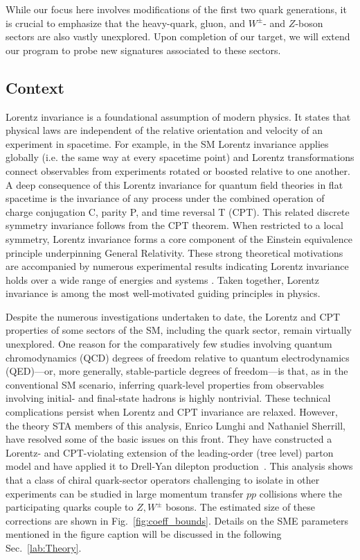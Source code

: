 While our focus here involves modifications of
the first two quark generations, it 
is crucial to emphasize that 
the heavy-quark, gluon, and 
$W^\pm$- and $Z$-boson sectors are also 
vastly unexplored. Upon completion 
of our target, we will extend our program to probe
new signatures associated to these sectors.

\subsection{Context}
\label{ssec:Context}
Lorentz invariance is a foundational assumption
of modern physics. It states that 
physical laws are independent of the relative orientation 
and velocity of an experiment in spacetime. 
For example, in the SM
Lorentz invariance applies 
globally (i.e. the same way at every spacetime point) 
and Lorentz transformations connect
observables from experiments rotated or boosted
relative to one another.
A deep consequence of this Lorentz invariance for
quantum field theories in flat spacetime
is the invariance of any process under
the combined operation of charge conjugation C,  
parity P, and time reversal T (CPT). This 
related discrete symmetry invariance 
follows from the CPT theorem.
%
When restricted to a local symmetry,
Lorentz invariance forms a core component 
of the Einstein equivalence principle 
underpinning General Relativity.
These strong theoretical motivations are accompanied by
numerous experimental results indicating 
Lorentz invariance holds over a wide
range of energies and systems \cite{datatables}.
Taken together, Lorentz invariance 
is among the most well-motivated guiding
principles in physics. 

Despite the numerous investigations undertaken to date, 
the Lorentz and CPT properties of some sectors of the SM, 
including the quark sector, remain virtually unexplored.
One reason for the comparatively few studies involving
quantum chromodynamics (QCD) degrees of freedom relative to
quantum electrodynamics (QED)---or, more generally, stable-particle 
degrees of freedom---is that, as in the conventional 
SM scenario, inferring quark-level 
properties from observables involving initial- and final-state hadrons 
is highly nontrivial. These technical complications 
persist when Lorentz and 
CPT invariance are relaxed. However, 
the theory STA members of this analysis, 
Enrico Lunghi and Nathaniel Sherrill, 
have resolved some of the basic issues on this front. 
They have constructed a Lorentz- and CPT-violating
extension of the leading-order (tree level) parton model
and have applied it to Drell-Yan dilepton production~\cite{Lunghi_2021}.
This analysis shows that a class of 
chiral quark-sector operators
challenging to isolate in other experiments 
can be studied in large momentum transfer $pp$ collisions where the 
participating quarks couple to $Z,W^{\pm}$ bosons.
The estimated size of these corrections are shown in 
Fig.~\ref{fig:coeff_bounds}. Details on the SME parameters
mentioned in the figure caption will be discussed in the following
Sec.~\ref{lab:Theory}.


